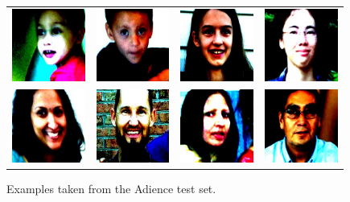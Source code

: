 \documentclass[preprint]{elsarticle}
\begin{document}
\begin{figure}[!t]
	\centering
	\begin{tabular}{cccc}
		\includegraphics[width=2.4cm]{img/adience/1.jpg} & \includegraphics[width=2.4cm]{img/adience/2.jpg} & \includegraphics[width=2.4cm]{img/adience/3.jpg} & \includegraphics[width=2.4cm]{img/adience/4.jpg}\\
		\includegraphics[width=2.4cm]{img/adience/5.jpg} & \includegraphics[width=2.4cm]{img/adience/6.jpg} & \includegraphics[width=2.4cm]{img/adience/7.jpg} & \includegraphics[width=2.4cm]{img/adience/8.jpg}
	\end{tabular}						
	\caption{Examples taken from the Adience test set.}
	\label{fig:AdienceExamples}
\end{figure}
\end{document}

